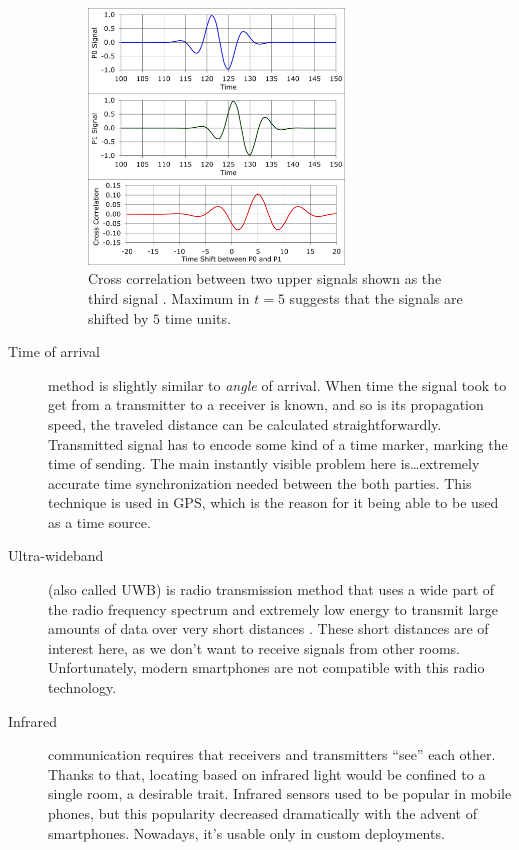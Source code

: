 \begin{description}
	\begin{figure}[h]
		\centering
		\includegraphics[width=0.67\textwidth]{cross-corr-pulse}
		\caption{Cross correlation between two upper signals shown as the third signal \cite{wiki:cross-corr-pulse}. Maximum in $t=5$ suggests that the signals are shifted by $5$ time units.}
		\label{fig:cross-corr-pulse}
	\end{figure}
	
	\item[Time of arrival] method is slightly similar to \emph{angle} of arrival. When time the signal took to get from a transmitter to a receiver is known, and so is its propagation speed, the traveled distance can be calculated straightforwardly. Transmitted signal has to encode some kind of a time marker, marking the time of sending. The main instantly visible problem here is\ldots extremely accurate time synchronization needed between the both parties. This technique is used in GPS, which is the reason for it being able to be used as a time source.
	
	\item[Ultra-wideband] (also called UWB) is radio transmission method that uses a wide part of the radio frequency spectrum and extremely low energy to transmit large amounts of data over very short distances \cite{ultra-wideband}. These short distances are of interest here, as we don't want to receive signals from other rooms. Unfortunately, modern smartphones are not compatible with this radio technology.
	
	\item[Infrared] communication requires that receivers and transmitters ``see'' each other. Thanks to that, locating based on infrared light would be confined to a single room, a desirable trait. Infrared sensors used to be popular in mobile phones, but this popularity decreased dramatically with the advent of smartphones. Nowadays, it's usable only in custom deployments.
	

\end{description}
